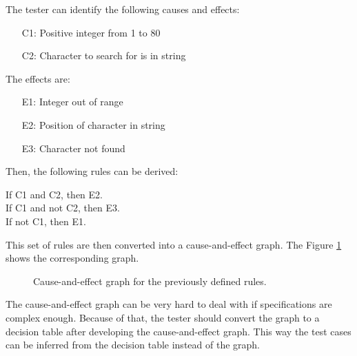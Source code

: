 The tester can identify the following causes and effects:

\begin{enumerate}[noitemsep]
    \item[C1:] Positive integer from 1 to 80
    \item[C2:] Character to search for is in string
\end{enumerate}

The effects are:

\begin{enumerate}[noitemsep]
    \item[E1:] Integer out of range
    \item[E2:] Position of character in string
    \item[E3:] Character not found
\end{enumerate}

Then, the following rules can be derived:

\begin{center}
    \begin{minipage}{0.5\textwidth}
        If C1 and C2, then E2.\\
        If C1 and not C2, then E3.\\
        If not C1, then E1.
    \end{minipage}
\end{center}

This set of rules are then converted into a cause-and-effect graph. The Figure \ref{fig:cause-n-effect-graph} shows the corresponding graph.

\begin{figure}[H]
    \centering
    \caption{Cause-and-effect graph for the previously defined rules.}
    \label{fig:cause-n-effect-graph}
\end{figure}

The cause-and-effect graph can be very hard to deal with if specifications are complex enough. Because of that, the tester should convert the graph to a decision table after developing the cause-and-effect graph. This way the test cases can be inferred from the decision table instead of the graph.

